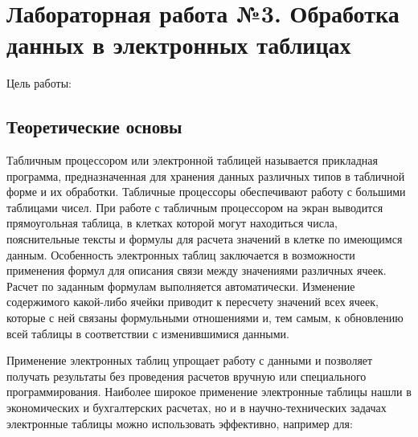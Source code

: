 

%

\section{Лабораторная работа №3. Обработка данных в электронных таблицах}

Цель работы:

\subsection{Теоретические основы}

Табличным процессором или электронной таблицей называется прикладная программа, предназначенная для хранения данных различных типов в табличной форме и их обработки. Табличные процессоры обеспечивают работу с большими таблицами чисел. При работе с табличным процессором на экран выводится прямоугольная таблица, в клетках которой могут находиться числа, пояснительные тексты и формулы для расчета значений в клетке по имеющимся данным. Особенность электронных таблиц заключается в возможности применения формул для описания связи между значениями различных ячеек. Расчет по заданным формулам выполняется автоматически. Изменение содержимого какой-либо ячейки приводит к пересчету значений всех ячеек, которые с ней связаны формульными отношениями и, тем самым, к обновлению всей таблицы в соответствии с изменившимися данными.

Применение электронных таблиц упрощает работу с данными и позволяет получать результаты без проведения расчетов вручную или специального программирования. Наиболее широкое применение электронные таблицы нашли в экономических и бухгалтерских расчетах, но и в научно-технических задачах электронные таблицы можно использовать эффективно, например для:

